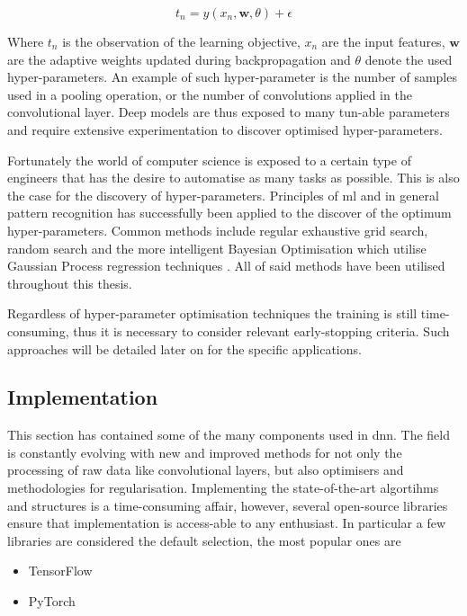 \begin{equation}
    t_n = y(x_n, \mathbf{w}, \theta) + \epsilon
\end{equation}

Where $t_n$ is the observation of the learning objective, $x_n$ are the input features, $\mathbf{w}$ are the adaptive weights updated during backpropagation and $\theta$ denote the used hyper-parameters. An example of such hyper-parameter is the number of samples used in a pooling operation, or the number of convolutions applied in the convolutional layer. Deep models are thus exposed to many tun-able parameters and require extensive experimentation to discover optimised hyper-parameters.

Fortunately the world of computer science is exposed to a certain type of engineers that has the desire to automatise as many tasks as possible. This is also the case for the discovery of hyper-parameters. Principles of \gls{ml} and in general pattern recognition has successfully been applied to the discover of the optimum hyper-parameters. Common methods include regular exhaustive grid search, random search and the more intelligent Bayesian Optimisation which utilise Gaussian Process regression techniques \cite{YuHyper-ParameterApplications}. All of said methods have been utilised throughout this thesis.

Regardless of hyper-parameter optimisation techniques the training is still time-consuming, thus it is necessary to consider relevant early-stopping criteria. Such approaches will be detailed later on for the specific applications.


\subsection{Implementation}
This section has contained some of the many components used in \gls{dnn}. The field is constantly evolving with new and improved methods for not only the processing of raw data like convolutional layers, but also optimisers and methodologies for regularisation.  Implementing the state-of-the-art algortihms and structures is a time-consuming affair, however, several open-source libraries ensure that implementation is access-able to any enthusiast. In particular a few libraries are considered the default selection, the most popular ones are 

\begin{itemize}
    \item TensorFlow \cite{tensorflow2015-whitepaper}
    \item PyTorch \cite{Paszke2017AutomaticPyTorch}
\end{itemize}

